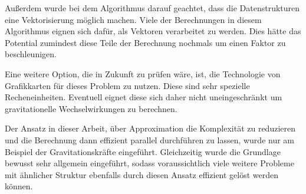    Außerdem wurde bei dem Algorithmus darauf geachtet, dass die Datenstrukturen eine Vektorisierung möglich machen. Viele der Berechnungen in diesem Algorithmus eignen sich dafür, als Vektoren
    verarbeitet zu werden. Dies hätte das Potential zumindest diese Teile der Berechnung nochmals um einen Faktor zu beschleunigen. 
    
    Eine weitere Option, die in Zukunft zu prüfen wäre, ist, die Technologie von Grafikkarten für dieses Problem zu nutzen. Diese sind sehr spezielle Recheneinheiten. Eventuell eignet diese sich
    daher nicht uneingeschränkt um gravitationelle Wechselwirkungen zu berechnen.
    
    Der Ansatz in dieser Arbeit, über Approximation die Komplexität zu reduzieren und die Berechnung dann effizient parallel durchführen zu lassen, wurde nur am Beispiel der Gravitationskräfte
    eingeführt. Gleichzeitig wurde die Grundlage bewusst sehr allgemein eingeführt, sodass voraussichtlich viele weitere Probleme mit ähnlicher Struktur ebenfalls durch diesen Ansatz effizient
    gelöst werden können.